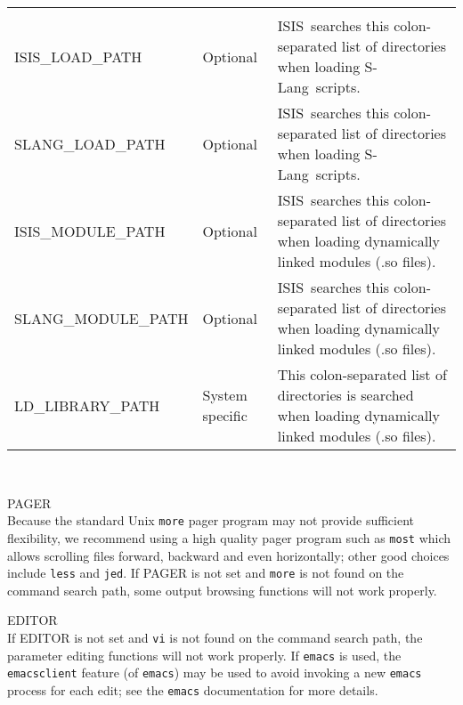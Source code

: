 \documentclass{book}
\newcommand{\isisx}{{\sc ISIS~}}
\newcommand{\slang}{{\sc S-Lang}}
\begin{document}
{\begin{samepage}
\begin{table}[ht]
\begin{tabular}{|l|p{0.8in}|p{3.2in}|}
\rule[-1mm]{0mm}{1mm} & & \hfill \\
\hline
\rule[-1mm]{0mm}{1mm} & & \hfill \\

{\sc ISIS\_LOAD\_PATH} & Optional &
\isisx searches this colon-separated list of directories when loading
\slang{}ripts. \\

{\sc SLANG\_LOAD\_PATH} & Optional &
\isisx searches this colon-separated list of directories when loading
\slang{}ripts.\\

{\sc ISIS\_MODULE\_PATH} & Optional &
\isisx searches this colon-separated list of directories when loading
dynamically linked modules (.so files). \\

{\sc SLANG\_MODULE\_PATH} & Optional &
\isisx searches this colon-separated list of directories when loading
dynamically linked modules (.so files). \\

{\sc LD\_LIBRARY\_PATH} & System specific &
This colon-separated list of directories is searched when loading
dynamically linked modules (.so files). \\
\hline
\end{tabular}
\end{table}
\clearpage
{}~\begin{list}{}{
                 \setlength{\leftmargin}{1cm}
                 \setlength{\rightmargin}{1cm}
              }
\item[{\sc PAGER}] \hfill \\
Because the standard Unix {\tt more} pager program may not provide
sufficient flexibility, we recommend using a high quality pager program such
as {\tt most} which allows scrolling files forward, backward and even
horizontally; other good choices include {\tt less} and {\tt jed}. If {\sc
PAGER} is not set and {\tt more} is not found on the command search path,
some output browsing functions will not work properly. \\

\item[{\sc EDITOR}] \hfill \\
If {\sc EDITOR} is not set and {\tt vi} is not found on the
command search path, the parameter editing functions will not work properly.
If {\tt emacs} is used, the {\tt emacsclient} feature
(of {\tt emacs}) may be used to avoid invoking a new {\tt emacs} process for
each edit; see the {\tt emacs} documentation for more details. \\
\end{list}
\end{samepage}
\vfill

}
\end{document}
